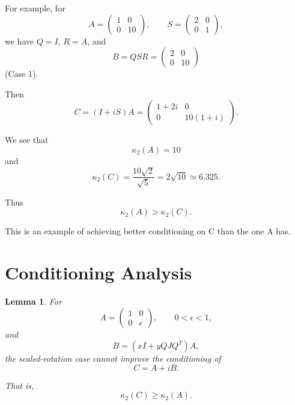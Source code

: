 \documentclass[11pt, reqno, a4paper]{amsart}
\theoremstyle{plain}
\newtheorem{lemma}[theorem]{Lemma}
\theoremstyle{definition}
\theoremstyle{remark}
\numberwithin{equation}{section}
\begin{document}
For example, for
\[
A=
\begin{pmatrix}
1&0\\
0&10
\end{pmatrix},
\qquad
S=
\begin{pmatrix}
2&0\\
0&1
\end{pmatrix},
\]
we have $Q=I$, $R=A$, and
\[
B=QSR=
\begin{pmatrix}
2&0\\
0&10
\end{pmatrix}
\]
(Case 1).

Then
\[
C=(I+iS)A
=
\begin{pmatrix}
1+2i&0\\
0&10(1+i)
\end{pmatrix}.
\]

We see that
\[
\kappa_2(A)=10
\]
and
\[
\kappa_2(C)
=
\frac{10\sqrt{2}}{\sqrt{5}}
=
2\sqrt{10}
\simeq6.325.
\]

Thus
\[
\kappa_2(A)>\kappa_2(C).
\]

This is an example of achieving better conditioning on C than the one A has.


\section{Conditioning Analysis}

\begin{lemma}
For
\[
A=
\begin{pmatrix}
1&0\\
0&\epsilon
\end{pmatrix},
\qquad 0<\epsilon<1,
\]
and
\[
B=(xI+yQJQ^T)A,
\]
the scaled-rotation case cannot improve the conditioning of
\[
C=A+iB.
\]

That is,
\[
\kappa_2(C)\geq\kappa_2(A).
\]
\end{lemma}
\end{document}
